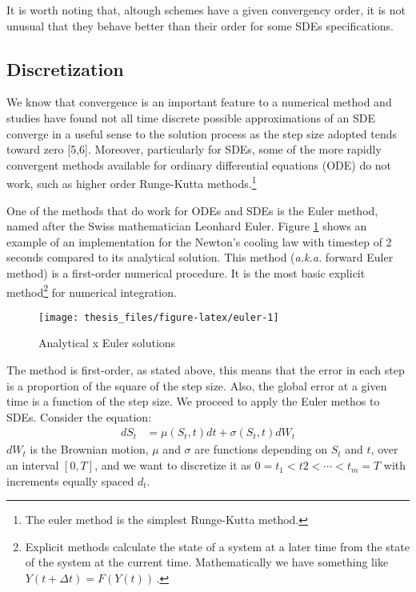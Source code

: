 \documentclass[12pt,twoside]{reedthesis}
\theoremstyle{definition}
\theoremstyle{definition}
\theoremstyle{remark}
\begin{document}
  It is worth noting that, altough schemes have a given convergency order,
  it is not unusual that they behave better than their order for some SDEs
  specifications.
  
  \subsection{Discretization}\label{discretization}
  
  We know that convergence is an important feature to a numerical method
  and studies have found not all time discrete possible approximations of
  an SDE converge in a useful sense to the solution process as the step
  size adopted tends toward zero {[}5,6{]}. Moreover, particularly for
  SDEs, some of the more rapidly convergent methods available for ordinary
  differential equations (ODE) do not work, such as higher order
  Runge-Kutta methods.\footnote{The euler method is the simplest
    Runge-Kutta method.}
  
  One of the methods that do work for ODEs and SDEs is the Euler method,
  named after the Swiss mathematician Leonhard Euler. Figure
  \ref{fig:euler} shows an example of an implementation for the Newton's
  cooling law with timestep of 2 seconds compared to its analytical
  solution. This method (\emph{a.k.a.} forward Euler method) is a
  first-order numerical procedure. It is the most basic explicit
  method\footnote{Explicit methods calculate the state of a system at a
    later time from the state of the system at the current time.
    Mathematically we have something like \(Y(t+\Delta t)=F(Y(t))\,\).}
  for numerical integration.
  \begin{figure}
  
  {\centering \texttt{[image: thesis\_files/figure-latex/euler-1]} 
  
  }
  
  \caption{Analytical x Euler solutions \label{euler}}\label{fig:euler}
  \end{figure}
  The method is first-order, as stated above, this means that the error in
  each step is a proportion of the square of the step size. Also, the
  global error at a given time is a function of the step size. We proceed
  to apply the Euler methos to SDEs. Consider the equation:
  \begin{align}
  dS_t &= \mu(S_t,t) dt + \sigma(S_t,t) dW_t
  \end{align}
  \(dW_t\) is the Brownian motion, \(\mu\) and \(\sigma\) are functions
  depending on \(S_t\) and \(t\), over an interval \([0,T]\), and we want
  to discretize it as \(0 = t_1 < t2 < \cdots < t_m = T\) with increments
  equally spaced \(d_t\).
  
\end{document}
